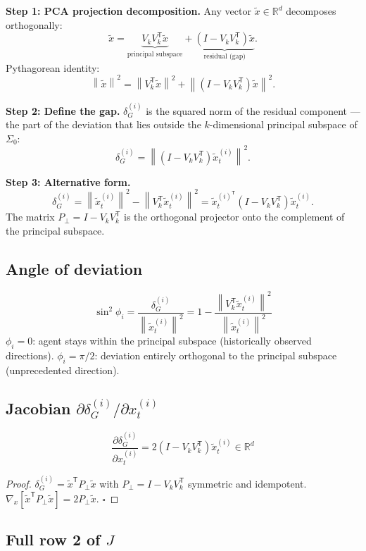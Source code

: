 \documentclass[11pt,a4paper]{article}
\theoremstyle{definition}
\newcommand{\R}{\mathbb{R}}
\newcommand{\T}{^{\mathsf{T}}}
\newcommand{\norm}[1]{\left\|#1\right\|}
\begin{document}
\textbf{Step 1: PCA projection decomposition.}
Any vector $\tilde x \in \R^d$ decomposes orthogonally:
\[
\tilde x = \underbrace{V_kV_k\T\tilde x}_{\text{principal subspace}} + \underbrace{(I-V_kV_k\T)\tilde x}_{\text{residual (gap)}}.
\]
Pythagorean identity:
\[
\norm{\tilde x}^2 = \norm{V_k\T\tilde x}^2 + \norm{(I-V_kV_k\T)\tilde x}^2.
\]

\textbf{Step 2: Define the gap.}
$\delta_G^{(i)}$ is the squared norm of the residual component — the part of the deviation
that lies outside the $k$-dimensional principal subspace of $\Sigma_0$:
\[
\delta_G^{(i)} = \norm{(I-V_kV_k\T)\tilde x_t^{(i)}}^2.
\]

\textbf{Step 3: Alternative form.}
\[
\delta_G^{(i)} = \norm{\tilde x_t^{(i)}}^2 - \norm{V_k\T\tilde x_t^{(i)}}^2
= \tilde x_t^{(i)\T}(I - V_kV_k\T)\tilde x_t^{(i)}.
\]
The matrix $P_\perp = I - V_kV_k\T$ is the orthogonal projector onto the complement of the principal subspace.

\subsection{Angle of deviation}

\[
\sin^2\phi_i = \frac{\delta_G^{(i)}}{\norm{\tilde x_t^{(i)}}^2} = 1 - \frac{\norm{V_k\T\tilde x_t^{(i)}}^2}{\norm{\tilde x_t^{(i)}}^2}
\]
$\phi_i = 0$: agent stays within the principal subspace (historically observed directions).
$\phi_i = \pi/2$: deviation entirely orthogonal to the principal subspace (unprecedented direction).

\subsection{Jacobian $\partial\delta_G^{(i)}/\partial x_t^{(i)}$}

\begin{lockedbox}
\[
\frac{\partial\delta_G^{(i)}}{\partial x_t^{(i)}} = 2(I - V_kV_k\T)\tilde x_t^{(i)} \in \R^d
\]
\end{lockedbox}

\begin{proof}
$\delta_G^{(i)} = \tilde x\T P_\perp\tilde x$ with $P_\perp = I - V_kV_k\T$ symmetric and idempotent.
$\nabla_x[\tilde x\T P_\perp\tilde x] = 2P_\perp\tilde x$. $\square$
\end{proof}

\subsection{Full row 2 of $J$}
\end{document}
